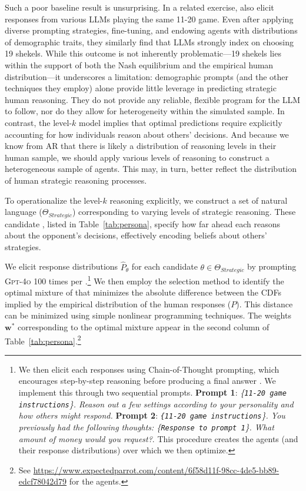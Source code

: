 Such a poor baseline result is unsurprising.
In a related exercise, \cite{gao2024caution} also elicit responses from various LLMs playing the same 11-20 game.
Even after applying diverse prompting strategies, fine-tuning, and endowing agents with distributions of demographic traits, they similarly find that LLMs strongly index on choosing 19 shekels.
While this outcome is not inherently problematic---19 shekels lies within the support of both the Nash equilibrium and the empirical human distribution---it underscores a limitation: demographic prompts (and the other techniques they employ) alone provide little leverage in predicting strategic human reasoning.
They do not provide any reliable, flexible program for the LLM to follow, nor do they allow for heterogeneity within the simulated sample.
In contrast, the level-$k$ model implies that optimal predictions require explicitly accounting for how individuals reason about others' decisions.
And because we know from AR that there is likely a distribution of reasoning levels in their human sample, we should apply various levels of reasoning to construct a heterogeneous sample of agents.
This may, in turn, better reflect the distribution of human strategic reasoning processes.

To operationalize the level-$k$ reasoning explicitly, we construct a set of natural language  ($\Theta_{Strategic}$) corresponding to varying levels of strategic reasoning.
These candidate , listed in Table~\ref{tab:persona}, specify how far ahead each \aisub{} reasons about the opponent's decisions, effectively encoding beliefs about others' strategies.

We elicit response distributions $\hat P_{\theta}$ for each candidate \persona{} $\theta \in \Theta_{Strategic}$ by prompting \textsc{Gpt-4o} 100 times per \persona{}.\footnote{We then elicit each  responses using Chain-of-Thought prompting, which encourages step-by-step reasoning before producing a final answer \citep{weiCOT2024}. We implement this through two sequential prompts. \textbf{Prompt 1}: \emph{\{\texttt{11-20 game instructions}\}. Reason out a few settings according to your personality and how others might respond.} \textbf{Prompt 2}: \emph{\texttt{\{11-20 game instructions}\}. You previously had the following thoughts: \{\texttt{Response to prompt 1}\}. What amount of money would you request?}. This procedure creates the agents (and their response distributions) over which we then optimize.}
We then employ the selection method to identify the optimal mixture of  that minimizes the absolute difference between the CDFs implied by the empirical distribution of the human responses ($P$).
This distance can be minimized using simple nonlinear programming techniques.
The weights $\mathbf{w}^*$ corresponding to the optimal mixture appear in the second column of Table~\ref{tab:persona}.\footnote{See \url{https://www.expectedparrot.com/content/6f58d11f-98cc-4de5-bb89-edcf78042d79} for the agents.}

